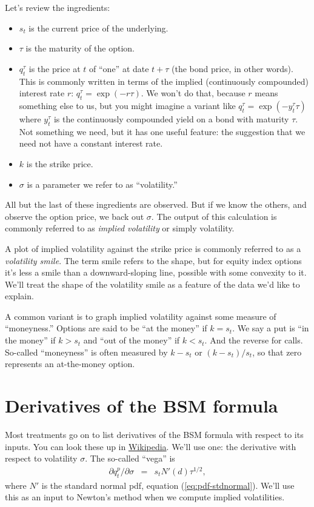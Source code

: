 \documentclass[11pt]{article}
\begin{document}
Let's review the ingredients:
\begin{itemize}
\item $s_t$ is the current price of the underlying.
\item $\tau$ is the maturity of the option.
\item $q_t^\tau$ is the price at $t$ of ``one'' at date $t+\tau$  (the bond price, in other words).
This is commonly written in terms of the implied (continuously compounded) interest rate $r$:
$q_t^\tau = \exp(-r \tau)$.
We won't do that, because $r$ means something else to us, but you might imagine
a variant like $q_t^\tau = \exp(-y_t^\tau \tau)$
where $y_t^\tau$ is the continuously compounded yield on a bond with maturity $\tau$.
Not something we need, but it has one useful feature:
the suggestion that we need not have a constant interest rate.
\item $k$ is the strike price.
\item $\sigma$ is a parameter we refer to as ``volatility.''
\end{itemize}
All but the last of these ingredients are observed.
But if we know the others,
and observe the option price, we back out $\sigma$.
The output of this calculation is commonly referred to as {\it implied volatility\/}
or simply volatility.


A plot of implied volatility against the strike price
is commonly referred to as a {\it volatility smile\/}.
The term smile refers to the shape, but for equity index options
it's less a smile than a downward-sloping line, possible with some
convexity to it.
We'll treat the shape of the volatility smile as a feature of the data we'd like
to explain.

A common variant is to graph implied volatility against
some measure of ``moneyness.''
Options are said to be ``at the money'' if $ k = s_t$.
We say a put is ``in the money'' if $k > s_t $ and ``out of the money''
if $ k< s_t $.
And the reverse for calls.
So-called ``moneyness'' is often measured by $ k-s_t$ or $(k-s_t)/s_t$,
so that zero represents an at-the-money option.

\section{Derivatives of the BSM formula}

Most treatments go on to list derivatives of the BSM formula
with respect to its inputs.
You can look these up in 
\href{http://en.wikipedia.org/wiki/Black-Scholes_model#The_Greeks}{Wikipedia}.  
We'll use one:  the derivative with respect to volatility $\sigma$.
The so-called ``vega'' is 
\begin{eqnarray*}
    \partial q^p_t /\partial \sigma &=& 
            s_t N'(d) \tau^{1/2} ,
\end{eqnarray*}
where $N'$ is the standard normal pdf, equation (\ref{eq:pdf-stdnormal}). 
We'll use this as an input to Newton's method when we compute
implied volatilities. 
\end{document}

